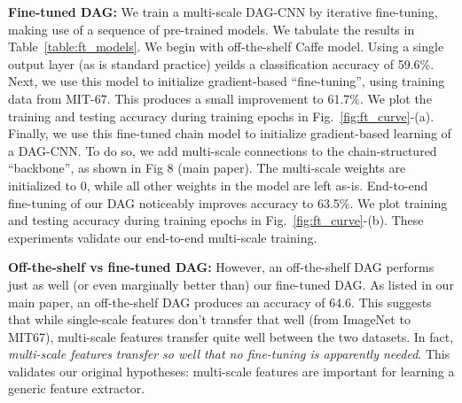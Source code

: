 \documentclass[10pt,twocolumn,letterpaper]{article}
\begin{document}
{\bf Fine-tuned DAG:} We train a multi-scale DAG-CNN by iterative fine-tuning, making use of a sequence of pre-trained models. We tabulate the results in Table~\ref{table:ft_models}. We begin with off-the-shelf Caffe model. Using a single output layer (as is standard practice) yeilds a classification accuracy of 59.6\%. Next, we use this model to initialize gradient-based ``fine-tuning'', using training data from MIT-67. This produces a small improvement to 61.7\%. We plot the training and testing accuracy during training epochs in Fig.~\ref{fig:ft_curve}-(a). Finally, we use this fine-tuned chain model to initialize gradient-based learning of a DAG-CNN. To do so, we add multi-scale connections to the chain-structured ``backbone'', as shown in Fig 8 (main paper). The multi-scale weights are initialized to 0, while all other weights in the model are left as-is. End-to-end fine-tuning of our DAG noticeably improves accuracy to 63.5\%. We plot training and testing accuracy during training epochs in Fig.~\ref{fig:ft_curve}-(b). These experiments validate our end-to-end multi-scale training.

{\bf Off-the-shelf vs fine-tuned DAG:} However, an off-the-shelf DAG performs just as well (or even marginally better than) our fine-tuned DAG. As listed in our main paper, an off-the-shelf DAG produces an accuracy of 64.6. This suggests that while single-scale features don't transfer that well (from ImageNet to MIT67), multi-scale features transfer quite well between the two datasets. In fact, {\em multi-scale features transfer so well that no fine-tuning is apparently needed}. This validates our original hypotheses: multi-scale features are important for learning a generic feature extractor.%





\end{document}
